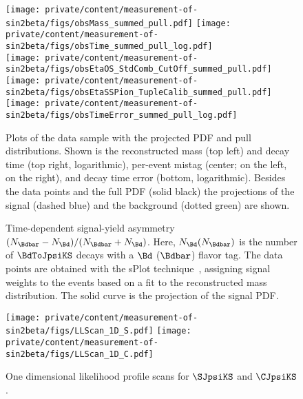\begin{figure}
\centering
\texttt{[image: private/content/measurement-of-sin2beta/figs/obsMass\_summed\_pull.pdf]} 
\texttt{[image: private/content/measurement-of-sin2beta/figs/obsTime\_summed\_pull\_log.pdf]} \\
\texttt{[image: private/content/measurement-of-sin2beta/figs/obsEtaOS\_StdComb\_CutOff\_summed\_pull.pdf]}
\texttt{[image: private/content/measurement-of-sin2beta/figs/obsEtaSSPion\_TupleCalib\_summed\_pull.pdf]} \\
\texttt{[image: private/content/measurement-of-sin2beta/figs/obsTimeError\_summed\_pull\_log.pdf]}
\caption{Plots of the \BdToJpsiKS data sample with the projected \ac{PDF} and
pull distributions. Shown is the reconstructed mass \obsMass (top left) and
decay time \obsTime (top right, logarithmic), per-event mistag (center;
\obsEtaOS on the left, \obsEtaSS on the right), and decay time error
\obsTimeError (bottom, logarithmic). Besides the data points and the full
\ac{PDF} (solid black) the projections of the signal (dashed blue) and the
background (dotted green) are shown.}
\label{fig:measurement_of_sin2beta:cpv_measurement:results:plots:dimensions}
\end{figure}
%
\begin{figure}
\centering
\begin{tikzpicture}[scale=0.38]

\end{tikzpicture}
\caption{
Time-dependent signal-yield asymmetry $(N_{\Bdbar} - N_{\Bd})/(N_{\Bdbar} +
N_{\Bd})$. Here, $N_{\Bd} (N_{\Bdbar})$ is the number of $\BdToJpsiKS$ decays with
a $\Bd$ ($\Bdbar$) flavor tag. The data points are obtained with the sPlot
technique~\cite{Pivk:2004ty}, assigning signal weights to the events based on a
fit to the reconstructed mass distribution. The solid curve is the projection of
the signal PDF. }
\label{fig:measurement_of_sin2beta:cpv_measurement:results:plots:asymmetry}
\end{figure}
%
\begin{figure}
\centering
\texttt{[image: private/content/measurement-of-sin2beta/figs/LLScan\_1D\_S.pdf]}
\texttt{[image: private/content/measurement-of-sin2beta/figs/LLScan\_1D\_C.pdf]}
\caption{One dimensional likelihood profile scans for $\SJpsiKS$ and $\CJpsiKS$.}
\label{fig:measurement_of_sin2beta:cpv_measurement:results:plots:1d_ll_scan}
\end{figure}
